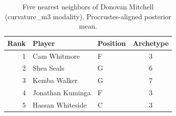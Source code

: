 \begin{table}[htbp]
  \centering\small
  \begin{tabular}{rllc}
    \toprule
    Rank & Player & Position & Archetype \\
    \midrule
    1 & Cam Whitmore & F & 3 \\
    2 & Shea Seals & G & 6 \\
    3 & Kemba Walker & G & 7 \\
    4 & Jonathan Kuminga & F & 3 \\
    5 & Hassan Whiteside & C & 3 \\
    \bottomrule
  \end{tabular}
  \caption{Five nearest neighbors of Donovan Mitchell (curvature_m3 modality), Procrustes-aligned posterior mean.}
  \label{tab:Donovan_Mitchell_neighbors_curvature_m3}
\end{table}

